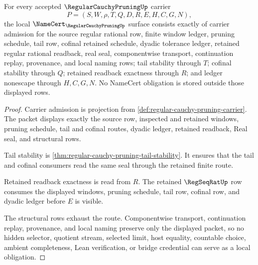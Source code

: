 \begin{theorem}
\label{thm:regular-cauchy-pruning-namecert-obligations}
For every accepted $\RegularCauchyPruningUp$ carrier
$$
P=(S,W,\rho,T,Q,D,R,E,H,C,G,N),
$$
the local $\NameCert_{\RegularCauchyPruningUp}$ surface consists exactly of carrier admission for the source regular rational row, finite window ledger, pruning schedule, tail row, cofinal retained schedule, dyadic tolerance ledger, retained regular rational readback, real seal, componentwise transport, continuation replay, provenance, and local naming rows; tail stability through $T$; cofinal stability through $Q$; retained readback exactness through $R$; and ledger nonescape through $H,C,G,N$. No NameCert obligation is stored outside those displayed rows.
\end{theorem}
\begin{proof}
Carrier admission is projection from \autoref{def:regular-cauchy-pruning-carrier}. The packet displays exactly the source row, inspected and retained windows, pruning schedule, tail and cofinal routes, dyadic ledger, retained readback, Real seal, and structural rows.

Tail stability is \autoref{thm:regular-cauchy-pruning-tail-stability}. It ensures that the tail and cofinal consumers read the same seal through the retained finite route.

Retained readback exactness is read from $R$. The retained $\RegSeqRatUp$ row consumes the displayed windows, pruning schedule, tail row, cofinal row, and dyadic ledger before $E$ is visible.

The structural rows exhaust the route. Componentwise transport, continuation replay, provenance, and local naming preserve only the displayed packet, so no hidden selector, quotient stream, selected limit, host equality, countable choice, ambient completeness, Lean verification, or bridge credential can serve as a local obligation.
\end{proof}



